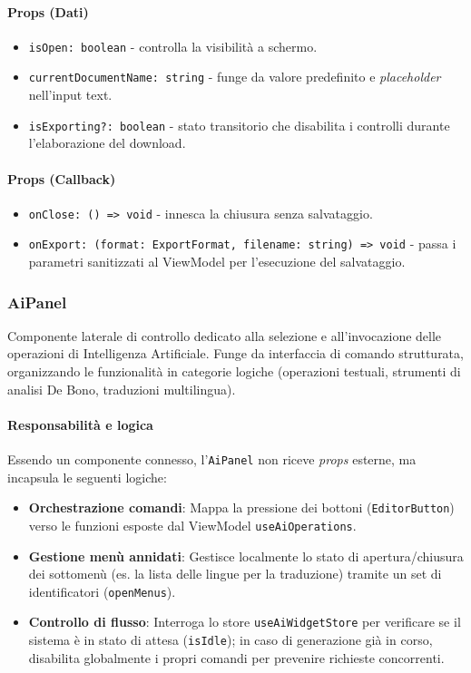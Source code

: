 \documentclass[11pt,a4paper]{article}
\begin{document}
\paragraph{Props (Dati)}
\begin{itemize}
    \item \texttt{isOpen: boolean} - controlla la visibilità a schermo.
    \item \texttt{currentDocumentName: string} - funge da valore predefinito e \textit{placeholder} nell'input text.
    \item \texttt{isExporting?: boolean} - stato transitorio che disabilita i controlli durante l'elaborazione del download.
\end{itemize}

\paragraph{Props (Callback)}
\begin{itemize}
    \item \texttt{onClose: () => void} - innesca la chiusura senza salvataggio.
    \item \texttt{onExport: (format: ExportFormat, filename: string) => void} - passa i parametri sanitizzati al ViewModel per l'esecuzione del salvataggio.
\end{itemize}

\subsubsection{AiPanel}
Componente laterale di controllo dedicato alla selezione e all'invocazione delle operazioni di Intelligenza Artificiale. Funge da interfaccia di comando strutturata, organizzando le funzionalità in categorie logiche (operazioni testuali, strumenti di analisi De Bono, traduzioni multilingua).

\paragraph{Responsabilità e logica}
Essendo un componente connesso, l'\texttt{AiPanel} non riceve \textit{props} esterne, ma incapsula le seguenti logiche:
\begin{itemize}
    \item \textbf{Orchestrazione comandi}: Mappa la pressione dei bottoni (\texttt{EditorButton}) verso le funzioni esposte dal ViewModel \texttt{useAiOperations}.
    \item \textbf{Gestione menù annidati}: Gestisce localmente lo stato di apertura/chiusura dei sottomenù (es. la lista delle lingue per la traduzione) tramite un set di identificatori (\texttt{openMenus}).
    \item \textbf{Controllo di flusso}: Interroga lo store \texttt{useAiWidgetStore} per verificare se il sistema è in stato di attesa (\texttt{isIdle}); in caso di generazione già in corso, disabilita globalmente i propri comandi per prevenire richieste concorrenti.
\end{itemize}
\end{document}
